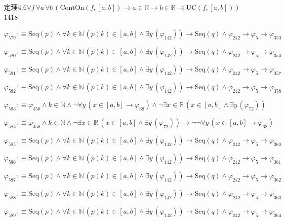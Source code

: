 \begin{fullproof}{定理4.6}{$\forall f\,\forall a\,\forall b\,(\mathrm{ContOn}(f,[a,b]) \to a \in \mathbb{R} \to b \in \mathbb{R} \to \mathrm{UC}(f,[a,b]))$}{1418}
\begin{abbrevlist}
\item $\varphi_{579} :\equiv \mathrm{Seq}(p) \land \forall k \in \mathbb{N}\,(p(k) \in [a,b] \land \exists y\,(\varphi_{142})) \to \mathrm{Seq}(q) \land \varphi_{242} \to \varphi_{5} \to \varphi_{353}$
\item $\varphi_{580} :\equiv \mathrm{Seq}(p) \land \forall k \in \mathbb{N}\,(p(k) \in [a,b] \land \exists y\,(\varphi_{142})) \to \mathrm{Seq}(q) \land \varphi_{242} \to \varphi_{5} \to \varphi_{354}$
\item $\varphi_{581} :\equiv \mathrm{Seq}(p) \land \forall k \in \mathbb{N}\,(p(k) \in [a,b] \land \exists y\,(\varphi_{142})) \to \mathrm{Seq}(q) \land \varphi_{242} \to \varphi_{5} \to \varphi_{357}$
\item $\varphi_{582} :\equiv \mathrm{Seq}(p) \land \forall k \in \mathbb{N}\,(p(k) \in [a,b] \land \exists y\,(\varphi_{142})) \to \mathrm{Seq}(q) \land \varphi_{242} \to \varphi_{5} \to \varphi_{358}$
\item $\varphi_{583} :\equiv \varphi_{458} \land k \in \mathbb{N} \land \neg \forall y\,(x \in [a,b] \to \varphi_{68}) \land \neg \exists x \in \mathbb{R}\,(x \in [a,b] \land \exists y\,(\varphi_{72}))$
\item $\varphi_{584} :\equiv \varphi_{458} \land k \in \mathbb{N} \land \neg \exists x \in \mathbb{R}\,(x \in [a,b] \land \exists y\,(\varphi_{72})) \to \neg \neg \forall y\,(x \in [a,b] \to \varphi_{68})$
\item $\varphi_{585} :\equiv \mathrm{Seq}(p) \land \forall k \in \mathbb{N}\,(p(k) \in [a,b] \land \exists y\,(\varphi_{142})) \to \mathrm{Seq}(q) \land \varphi_{242} \to \varphi_{5} \to \varphi_{360}$
\item $\varphi_{586} :\equiv \mathrm{Seq}(p) \land \forall k \in \mathbb{N}\,(p(k) \in [a,b] \land \exists y\,(\varphi_{142})) \to \mathrm{Seq}(q) \land \varphi_{242} \to \varphi_{5} \to \varphi_{361}$
\item $\varphi_{587} :\equiv \mathrm{Seq}(p) \land \forall k \in \mathbb{N}\,(p(k) \in [a,b] \land \exists y\,(\varphi_{142})) \to \mathrm{Seq}(q) \land \varphi_{242} \to \varphi_{5} \to \varphi_{362}$
\item $\varphi_{588} :\equiv \mathrm{Seq}(p) \land \forall k \in \mathbb{N}\,(p(k) \in [a,b] \land \exists y\,(\varphi_{142})) \to \mathrm{Seq}(q) \land \varphi_{242} \to \varphi_{5} \to \varphi_{363}$
\item $\varphi_{589} :\equiv \mathrm{Seq}(p) \land \forall k \in \mathbb{N}\,(p(k) \in [a,b] \land \exists y\,(\varphi_{142})) \to \mathrm{Seq}(q) \land \varphi_{242} \to \varphi_{5} \to \varphi_{364}$

\end{abbrevlist}
\end{fullproof}
